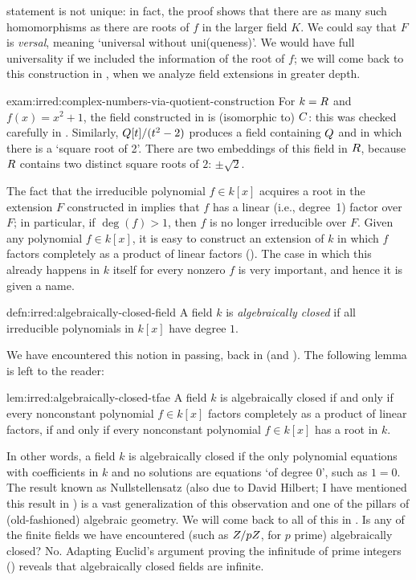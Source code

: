 statement is not unique: in fact, the proof shows that there are as
many such homomorphisms as there are roots of $f$ in the larger field
$K$. We could say that $F$ is \emph{versal}, meaning `universal
without uni(queness)'. We would have full universality if we included
the information of the root of $f$; we will come back to this
construction in , when we analyze field extensions
in greater depth.
\begin{exam}{}{exam:irred:complex-numbers-via-quotient-construction}
  For $k = R$ and $f(x) = x^2 + 1$, the field constructed in
   is (isomorphic to) $C$: this was checked
  carefully in . Similarly,
  $Q[t]/(t^2 - 2)$ produces a field containing $Q$ and in which
  there is a `square root of 2'. There are two embeddings of this
  field in $R$, because $R$ contains two distinct square roots of
  $2$: $\pm\sqrt{2}$.
\end{exam}
The fact that the irreducible polynomial $f \in k[x]$ acquires a root
in the extension $F$ constructed in  implies that
$f$ has a linear (i.e., degree~1) factor over $F$; in particular, if
$\deg(f) > 1$, then $f$ is no longer irreducible over $F$. Given any
polynomial $f \in k[x]$, it is easy to construct an extension of $k$
in which $f$ factors completely as a product of linear factors
(). The case in which
this already happens in $k$ itself for every nonzero $f$ is very
important, and hence it is given a name.
\begin{defn}{}{defn:irred:algebraically-closed-field}
  A field $k$ is \emph{algebraically closed} if all irreducible
  polynomials in $k[x]$ have degree $1$.
\end{defn}
We have encountered this notion in passing, back in
 (and
). The following lemma is
left to the reader:

\begin{lem}{}{lem:irred:algebraically-closed-tfae}
  A field $k$ is algebraically closed if and only if every nonconstant
  polynomial $f \in k[x]$ factors completely as a product of linear
  factors, if and only if every nonconstant polynomial $f \in k[x]$
  has a root in $k$.
\end{lem}

In other words, a field $k$ is algebraically closed if the only
polynomial equations with coefficients in $k$ and no solutions are
equations `of degree 0', such as $1 = 0$. The result known as
Nullstellensatz (also due to David Hilbert; I have mentioned this
result in ) is a vast generalization of this
observation and one of the pillars of (old-fashioned) algebraic
geometry. We will come back to all of this in
.
Is any of the finite fields we have encountered (such as $Z/pZ$, for
$p$ prime) algebraically closed? No. Adapting Euclid's argument
proving the infinitude of prime integers
() reveals that
algebraically closed fields are infinite.


